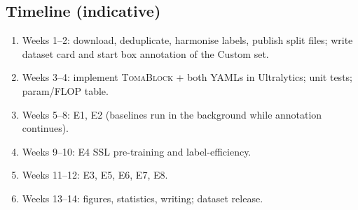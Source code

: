 \subsection{Timeline (indicative)}
\begin{enumerate}
  \item Weeks 1--2: download, deduplicate, harmonise labels, publish split files; write dataset card and start box annotation of the Custom set.
  \item Weeks 3--4: implement \textsc{TomaBlock} + both YAMLs in Ultralytics; unit tests; param/FLOP table.
  \item Weeks 5--8: E1, E2 (baselines run in the background while annotation continues).
  \item Weeks 9--10: E4 SSL pre-training and label-efficiency.
  \item Weeks 11--12: E3, E5, E6, E7, E8.
  \item Weeks 13--14: figures, statistics, writing; dataset release.
\end{enumerate}
